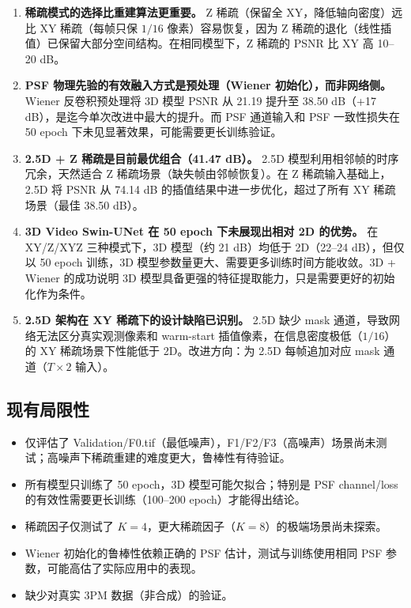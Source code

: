 \documentclass[UTF8, scheme=plain, 11pt, a4paper]{ctexart}
\begin{document}
\begin{enumerate}[leftmargin=*, label=\textbf{结论\arabic*.}]

\item \textbf{稀疏模式的选择比重建算法更重要。}
  Z 稀疏（保留全 XY，降低轴向密度）远比 XY 稀疏（每帧只保 $1/16$ 像素）容易恢复，因为 Z 稀疏的退化（线性插值）已保留大部分空间结构。在相同模型下，Z 稀疏的 PSNR 比 XY 高 10--20 dB。

\item \textbf{PSF 物理先验的有效融入方式是预处理（Wiener 初始化），而非网络侧。}
  Wiener 反卷积预处理将 3D 模型 PSNR 从 21.19 提升至 38.50 dB（+17 dB），是迄今单次改进中最大的提升。而 PSF 通道输入和 PSF 一致性损失在 50 epoch 下未见显著效果，可能需要更长训练验证。

\item \textbf{2.5D + Z 稀疏是目前最优组合（41.47 dB）。}
  2.5D 模型利用相邻帧的时序冗余，天然适合 Z 稀疏场景（缺失帧由邻帧恢复）。在 Z 稀疏输入基础上，2.5D 将 PSNR 从 74.14 dB 的插值结果中进一步优化，超过了所有 XY 稀疏场景（最佳 38.50 dB）。

\item \textbf{3D Video Swin-UNet 在 50 epoch 下未展现出相对 2D 的优势。}
  在 XY/Z/XYZ 三种模式下，3D 模型（约 21 dB）均低于 2D（22--24 dB），但仅以 50 epoch 训练，3D 模型参数量更大、需要更多训练时间方能收敛。3D + Wiener 的成功说明 3D 模型具备更强的特征提取能力，只是需要更好的初始化作为条件。

\item \textbf{2.5D 架构在 XY 稀疏下的设计缺陷已识别。}
  2.5D 缺少 mask 通道，导致网络无法区分真实观测像素和 warm-start 插值像素，在信息密度极低（$1/16$）的 XY 稀疏场景下性能低于 2D。改进方向：为 2.5D 每帧追加对应 mask 通道（$T\times2$ 输入）。

\end{enumerate}

\subsection{现有局限性}

\begin{itemize}
  \item 仅评估了 Validation/F0.tif（最低噪声），F1/F2/F3（高噪声）场景尚未测试；高噪声下稀疏重建的难度更大，鲁棒性有待验证。
  \item 所有模型只训练了 50 epoch，3D 模型可能欠拟合；特别是 PSF channel/loss 的有效性需要更长训练（100--200 epoch）才能得出结论。
  \item 稀疏因子仅测试了 $K=4$，更大稀疏因子（$K=8$）的极端场景尚未探索。
  \item Wiener 初始化的鲁棒性依赖正确的 PSF 估计，测试与训练使用相同 PSF 参数，可能高估了实际应用中的表现。
  \item 缺少对真实 3PM 数据（非合成）的验证。
\end{itemize}
\end{document}
